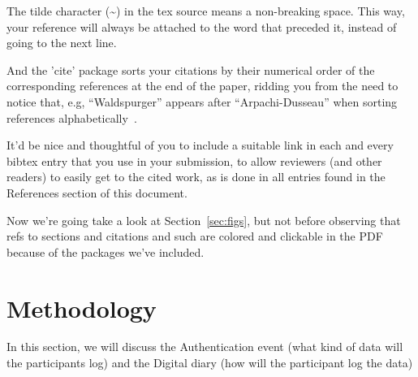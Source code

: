 The tilde character (\~{}) in the tex source means a non-breaking
space. This way, your reference will always be attached to the word
that preceded it, instead of going to the next line.

And the 'cite' package sorts your citations by their numerical order
of the corresponding references at the end of the paper, ridding you
from the need to notice that, e.g, ``Waldspurger'' appears after
``Arpachi-Dusseau'' when sorting references
alphabetically~\cite{waldspurger02,arpachiDusseau18:osbook}. 

It'd be nice and thoughtful of you to include a suitable link in each
and every bibtex entry that you use in your submission, to allow
reviewers (and other readers) to easily get to the cited work, as is
done in all entries found in the References section of this document.

Now we're going take a look at Section~\ref{sec:figs}, but not before
observing that refs to sections and citations and such are colored and
clickable in the PDF because of the packages we've included.

\section{Methodology}
\label{sec:method}




In this section, we will discuss the Authentication event (what kind of data will the participants log) and the Digital diary (how will the participant log the data)

